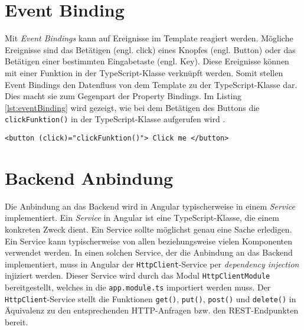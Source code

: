 \section{Event Binding}\label{subsec:eventBinding}

Mit \textit{Event Bindings} kann auf Ereignisse im Template reagiert werden. Mögliche Ereignisse sind das Betätigen (engl. click) eines Knopfes (engl. Button) oder das Betätigen einer bestimmten Eingabetaste (engl. Key). 
Diese Ereignisse können mit einer Funktion in der TypeScript-Klasse verknüpft werden. Somit stellen Event Bindings den Datenfluss von dem Template zu der TypeScript-Klasse dar. Dies macht sie zum Gegenpart der Property Bindings. 
Im Listing \ref{lst:eventBinding} wird gezeigt, wie bei dem Betätigen des Buttons die \texttt{clickFunktion()} in der TypeScript-Klasse aufgerufen wird \cite{Book2020}\cite{eventBinding2021}.

\begin{lstlisting}[caption=Event Binding, label=lst:eventBinding]
    <button (click)="clickFunktion()"> Click me </button>
\end{lstlisting}

\section{Backend Anbindung}

Die Anbindung an das Backend wird in Angular typischerweise in einem \textit{Service} implementiert. Ein \textit{Service} in Angular ist eine TypeScript-Klasse, die einem konkreten Zweck dient. Ein Service sollte möglichst genau eine Sache erledigen. Ein Service kann typischerweise von allen beziehungsweise vielen Komponenten verwendet werden. In einen solchen Service, der die Anbindung an das Backend implementiert, muss in Angular der \texttt{HttpClient}-Service per \textit{dependency injection} injiziert werden. Dieser Service wird durch das Modul \texttt{HttpClientModule} bereitgestellt, welches in die \texttt{app.module.ts} importiert werden muss. Der \texttt{HttpClient}-Service stellt die Funktionen \texttt{get()}, \texttt{put()}, \texttt{post()} und \texttt{delete()} in Äquivalenz zu den entsprechenden HTTP-Anfragen bzw. den REST-Endpunkten bereit.
